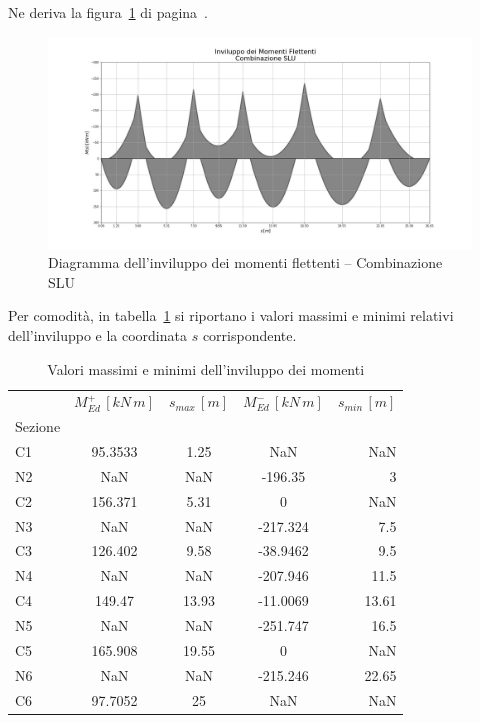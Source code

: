  Ne deriva la figura~\ref{fig:bendingMomentEnvelope_slu} di pagina~\pageref{fig:bendingMomentEnvelope_slu}.
 
 \begin{figure}
 	\centering
 	\includegraphics[width=\textwidth]{../../export/img/bendingMomentEnvelope_slu}
 	\caption{Diagramma dell'inviluppo dei momenti flettenti -- Combinazione SLU}
 	\label{fig:bendingMomentEnvelope_slu}
 \end{figure}

 Per comodità, in tabella~\ref{tab:max_min_bendingMomentEnvelope_slu} si riportano i valori massimi e minimi relativi dell'inviluppo e la coordinata $s$ corrispondente.
 
  \begin{table}
  	\centering
  	\caption{Valori massimi e minimi dell'inviluppo dei momenti}
  	\label{tab:max_min_bendingMomentEnvelope_slu}
  	\begin{tabular}{lcccr}
		\toprule
		& $M_{Ed}^+\,[kN\,m]$ & $s_{max}\,[m]$ & $M_{Ed}^-\,[kN\,m]$ & $s_{min}\,[m]$ \\
		Sezione &             &          &             &          \\
		\midrule
		C1      &     95.3533 &     1.25 &         NaN &      NaN \\
		N2      &         NaN &      NaN &     -196.35 &        3 \\
		C2      &     156.371 &     5.31 &           0 &      NaN \\
		N3      &         NaN &      NaN &    -217.324 &      7.5 \\
		C3      &     126.402 &     9.58 &    -38.9462 &      9.5 \\
		N4      &         NaN &      NaN &    -207.946 &     11.5 \\
		C4      &      149.47 &    13.93 &    -11.0069 &    13.61 \\
		N5      &         NaN &      NaN &    -251.747 &     16.5 \\
		C5      &     165.908 &    19.55 &           0 &      NaN \\
		N6      &         NaN &      NaN &    -215.246 &    22.65 \\
		C6      &     97.7052 &       25 &         NaN &      NaN \\
		\bottomrule
	\end{tabular}
  \end{table}

